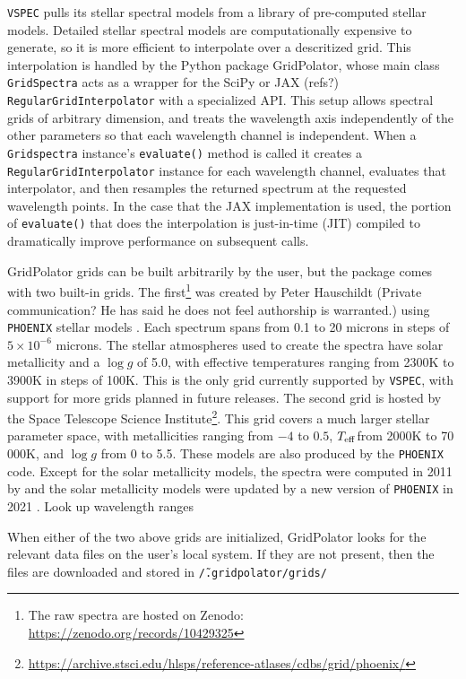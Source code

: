 \documentclass[twocolumn]{aastex631}
\newcommand{\teff}{$T_{\rm eff}$}
\newcommand{\TJ}[1]{\textcolor{tedcommentcolor}{#1}}
\newcommand{\vspec}[1]{\texttt{VSPEC}#1}
\begin{document}
\vspec{} pulls its stellar spectral models from a library of pre-computed stellar models. Detailed stellar spectral models are computationally expensive to generate, so it is more efficient to interpolate over a descritized grid. This interpolation is handled by the Python package GridPolator, whose main class \texttt{GridSpectra} acts as a wrapper for the SciPy or JAX \TJ{(refs?)} \texttt{RegularGridInterpolator} with a specialized API. This setup allows spectral grids of arbitrary dimension, and treats the wavelength axis independently of the other parameters so that each wavelength channel is independent. When a \texttt{Gridspectra} instance's \texttt{evaluate()} method is called it creates a \texttt{RegularGridInterpolator} instance for each wavelength channel, evaluates that interpolator, and then resamples the returned spectrum at the requested wavelength points. In the case that the JAX implementation is used, the portion of \texttt{evaluate()} that does the interpolation is just-in-time (JIT) compiled to dramatically improve performance on subsequent calls.

GridPolator grids can be built arbitrarily by the user, but the package comes with two built-in grids. The first\footnote{The raw spectra are hosted on Zenodo: \url{https://zenodo.org/records/10429325}} was created by Peter Hauschildt \TJ{(Private communication? He has said he does not feel authorship is warranted.)} using \texttt{PHOENIX} stellar models \citep{allard1994,hauschildt1999,husser2013}. Each spectrum spans from 0.1 to 20 microns in steps of $5\times10^{-6}$ microns. The stellar atmospheres used to create the spectra have solar metallicity and a $\log{g}$ of 5.0, with effective temperatures ranging from 2300K to 3900K in steps of 100K. This is the only grid currently supported by \vspec{}, with support for more grids planned in future releases. The second grid is hosted by the Space Telescope Science Institute\footnote{\url{https://archive.stsci.edu/hlsps/reference-atlases/cdbs/grid/phoenix/}}. This grid covers a much larger stellar parameter space, with metallicities ranging from $-4$ to $0.5$, \teff from 2000K to 70\,000K, and $\log{g}$ from 0 to 5.5. These models are also produced by the \texttt{PHOENIX} code. Except for the solar metallicity models, the spectra were computed in 2011 by \citet{allard2003, allard2007} and the solar metallicity models were updated by a new version of \texttt{PHOENIX} in 2021 \citep{allard2012}. \TJ{Look up wavelength ranges}

When either of the two above grids are initialized, GridPolator looks for the relevant data files on the user's local system. If they are not present, then the files are downloaded and stored in \texttt{\~/.gridpolator/grids/}
\end{document}
